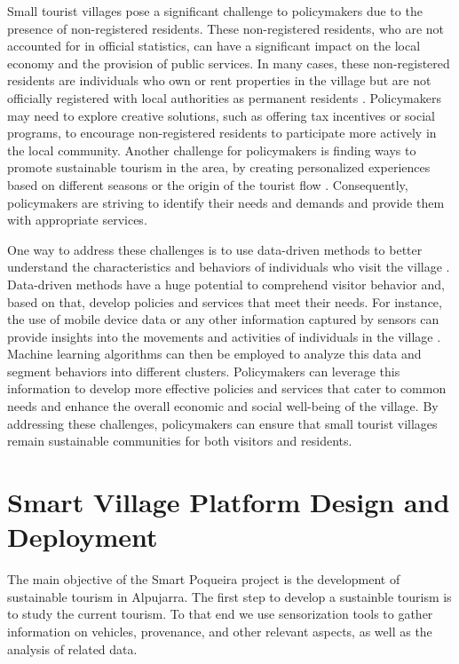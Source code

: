 Small tourist villages pose a significant challenge to policymakers due to the presence of non-registered residents. These non-registered residents, who are not accounted for in official statistics, can have a significant impact on the local economy and the provision of public services. In many cases, these non-registered residents are individuals who own or rent properties in the village but are not officially registered with local authorities as permanent residents \cite{jurado2009extranjeros}. Policymakers may need to explore creative solutions, such as offering tax incentives or social programs, to encourage non-registered residents to participate more actively in the local community. Another challenge for policymakers is finding ways to promote sustainable tourism in the area, by creating personalized experiences based on different seasons or the origin of the tourist flow \cite{staab2002intelligent}. Consequently, policymakers are striving to identify their needs and demands and provide them with appropriate services.

One way to address these challenges is to use data-driven methods to better understand the characteristics and behaviors of individuals who visit the village \cite{kastenholz2018diverse}. Data-driven methods have a huge potential to comprehend visitor behavior and, based on that, develop policies and services that meet their needs. For instance, the use of mobile device data or any other information captured by sensors can provide insights into the movements and activities of individuals in the village \cite{gutierrez2020profiling}. Machine learning algorithms can then be employed to analyze this data and segment behaviors into different clusters. Policymakers can leverage this information to develop more effective policies and services that cater to common needs and enhance the overall economic and social well-being of the village. By addressing these challenges, policymakers can ensure that small tourist villages remain sustainable communities for both visitors and residents.

\section{Smart Village Platform Design and Deployment} \label{sec:setup}

The main objective of the Smart Poqueira project is the development of sustainable tourism in Alpujarra. The first step to develop a sustainble tourism is to study the current tourism. To that end we use sensorization tools to gather information on vehicles, provenance, and other relevant aspects, as well as the analysis of related data.

